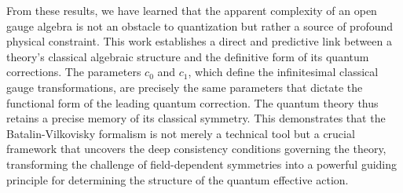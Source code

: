 \documentclass[twocolumn]{aastex631}
\begin{document}
From these results, we have learned that the apparent complexity of an open gauge algebra is not an obstacle to quantization but rather a source of profound physical constraint. This work establishes a direct and predictive link between a theory's classical algebraic structure and the definitive form of its quantum corrections. The parameters $c_0$ and $c_1$, which define the infinitesimal classical gauge transformations, are precisely the same parameters that dictate the functional form of the leading quantum correction. The quantum theory thus retains a precise memory of its classical symmetry. This demonstrates that the Batalin-Vilkovisky formalism is not merely a technical tool but a crucial framework that uncovers the deep consistency conditions governing the theory, transforming the challenge of field-dependent symmetries into a powerful guiding principle for determining the structure of the quantum effective action.
\end{document}
